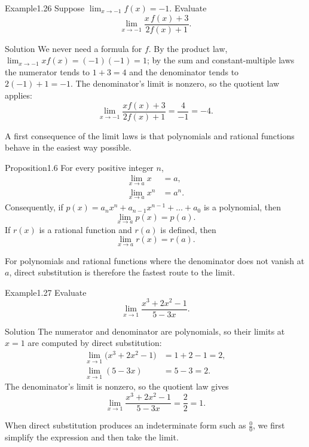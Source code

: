 \documentclass[a4paper,12pt,oneside]{memoir}
\begin{document}
\begin{workedexample}
\begin{envexample}{Example}{1.26}{}
Suppose \(\lim_{x \to -1} f(x) = -1\). Evaluate \[ \lim_{x \to -1} \frac{x\,f(x) + 3}{2 f(x) + 1}. \]
\end{envexample}
\begin{envsolution}{Solution}{}{}
We never need a formula for \(f\). By the product law, \(\lim_{x \to -1} x f(x) = (-1)(-1) = 1\); by the sum and constant-multiple laws the numerator tends to \(1 + 3 = 4\) and the denominator tends to \(2(-1) + 1 = -1\). The denominator’s limit is nonzero, so the quotient law applies: \[ \lim_{x \to -1} \frac{x f(x) + 3}{2 f(x) + 1} = \frac{4}{-1} = -4. \]
\end{envsolution}
\end{workedexample}
A first consequence of the limit laws is that polynomials and rational functions behave in the easiest way possible.

\begin{envproposition}{Proposition}{1.6}{}
For every positive integer \(n\), \[ \begin{aligned} \lim_{x \to a} x &= a,\\ \lim_{x \to a} x^{n} &= a^{n}. \end{aligned} \] Consequently, if \(p(x) = a_{n} x^{n} + a_{n-1} x^{n - 1} + \dots + a_{0}\) is a polynomial, then \[ \lim_{x \to a} p(x) = p(a). \] If \(r(x)\) is a rational function and \(r(a)\) is defined, then \[ \lim_{x \to a} r(x) = r(a). \]
\end{envproposition}
For polynomials and rational functions where the denominator does not vanish at \(a\), direct substitution is therefore the fastest route to the limit.

\begin{workedexample}
\begin{envexample}{Example}{1.27}{}
Evaluate \[ \lim_{x \to 1} \frac{x^{3} + 2x^{2} - 1}{5 - 3x}. \]
\end{envexample}
\begin{envsolution}{Solution}{}{}
The numerator and denominator are polynomials, so their limits at \(x = 1\) are computed by direct substitution: \[ \begin{aligned} \lim_{x \to 1}\bigl(x^{3} + 2x^{2} - 1\bigr) &= 1 + 2 - 1 = 2,\\ \lim_{x \to 1}(5 - 3x) &= 5 - 3 = 2. \end{aligned} \] The denominator’s limit is nonzero, so the quotient law gives \[ \lim_{x \to 1} \frac{x^{3} + 2x^{2} - 1}{5 - 3x} = \frac{2}{2} = 1. \]
\end{envsolution}
\end{workedexample}
When direct substitution produces an indeterminate form such as \(\tfrac{0}{0}\), we first simplify the expression and then take the limit.
\end{document}

